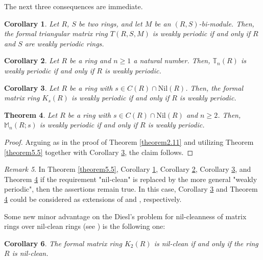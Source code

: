 \documentclass[12pt]{amsart}
\newtheorem{thm}{Theorem}[section]
\newtheorem{cor}[thm]{Corollary}
\theoremstyle{definition}
\theoremstyle{remark}
\newtheorem{rem}[thm]{Remark}
\numberwithin{equation}{section}
\begin{document}
The next three consequences are immediate.

\begin{cor}\label{new}
Let $R$, $S$ be two rings, and let $M$ be an $(R,S)$-bi-module. Then, the formal triangular matrix ring $T(R,S,M)$ is weakly periodic if and only if $R$ and $S$ are weakly periodic rings.
\end{cor}

\begin{cor}\label{corollary5.6}
Let $R$ be a ring and $n\geq 1$ a natural number. Then, $\mathbb{T}_n(R)$ is weakly periodic if and only if $R$ is weakly periodic.
\end{cor}

\begin{cor}\label{corollary5.7}
Let $R$ be a ring with $s\in C(R)\cap \mathrm{Nil}(R)$. Then, the formal matrix ring $K_s(R)$ is weakly periodic if and only if $R$ is weakly periodic.
\end{cor}

\begin{thm}\label{theorem5.8}
Let $R$ be a ring with $s\in C(R)\cap \mathrm{Nil}(R)$ and $n\geq 2$. Then, $\mathbb{M}_n(R;s)$ is weakly periodic if and only if $R$ is weakly periodic.
\end{thm}

\begin{proof}
Arguing as in the proof of Theorem \ref{theorem2.11} and utilizing Theorem \ref{theorem5.5} together with Corollary \ref{corollary5.7}, the claim follows.
\end{proof}

\begin{rem}\label{weakperiod}
In Theorem \ref{theorem5.5}, Corollary \ref{new}, Corollary \ref{corollary5.6}, Corollary \ref{corollary5.7}, and Theorem \ref{theorem5.8} if the requirement "nil-clean" is replaced by the more general "weakly periodic", then the assertions remain true. In this case, Corollary \ref{corollary5.7} and Theorem \ref{theorem5.8} could be considered as extensions of \cite[Corollary 3.5]{KWZ} and \cite[Theorem 3.6]{KWZ}, respectively.
\end{rem}

Some new minor advantage on the Diesl's problem for nil-cleanness of matrix rings over nil-clean rings (see \cite{D13}) is the following one:

\begin{cor}
The formal matrix ring $K_2(R)$ is nil-clean if and only if the ring $R$ is nil-clean.
\end{cor}
\end{document}
